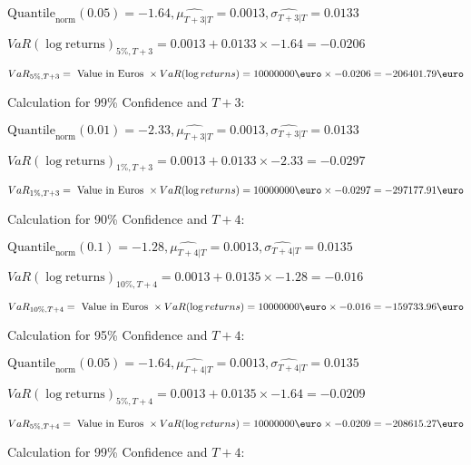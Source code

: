 \indent\indent $\text{Quantile}_\text{norm}(0.05) = -1.64,\hat{\mu_{T+3|T}} = 0.0013, \hat{\sigma_{T+3|T}} = 0.0133$

\indent\indent $VaR(\log \text{returns})_{5\%, T + 3} = 0.0013 + 0.0133\times-1.64 = -0.0206$

\indent\indent $VaR_{5\%, T + 3} = \text{ Value in Euros } \times VaR(\log returns) = 10 000 000 \text{\euro} \times-0.0206 = -206401.79 \text{\euro}$\newline




Calculation for 99\% Confidence and $T+3$:

\indent\indent $\text{Quantile}_\text{norm}(0.01) = -2.33,\hat{\mu_{T+3|T}} = 0.0013, \hat{\sigma_{T+3|T}} = 0.0133$

\indent\indent $VaR(\log \text{returns})_{1\%, T + 3} = 0.0013 + 0.0133\times-2.33 = -0.0297$

\indent\indent $VaR_{1\%, T + 3} = \text{ Value in Euros } \times VaR(\log returns) = 10 000 000 \text{\euro} \times-0.0297 = -297177.91 \text{\euro}$\newline




Calculation for 90\% Confidence and $T+4$:

\indent\indent $\text{Quantile}_\text{norm}(0.1) = -1.28,\hat{\mu_{T+4|T}} = 0.0013, \hat{\sigma_{T+4|T}} = 0.0135$

\indent\indent $VaR(\log \text{returns})_{10\%, T + 4} = 0.0013 + 0.0135\times-1.28 = -0.016$

\indent\indent $VaR_{10\%, T + 4} = \text{ Value in Euros } \times VaR(\log returns) = 10 000 000 \text{\euro} \times-0.016 = -159733.96 \text{\euro}$\newline




Calculation for 95\% Confidence and $T+4$:

\indent\indent $\text{Quantile}_\text{norm}(0.05) = -1.64,\hat{\mu_{T+4|T}} = 0.0013, \hat{\sigma_{T+4|T}} = 0.0135$

\indent\indent $VaR(\log \text{returns})_{5\%, T + 4} = 0.0013 + 0.0135\times-1.64 = -0.0209$

\indent\indent $VaR_{5\%, T + 4} = \text{ Value in Euros } \times VaR(\log returns) = 10 000 000 \text{\euro} \times-0.0209 = -208615.27 \text{\euro}$\newline




Calculation for 99\% Confidence and $T+4$:

